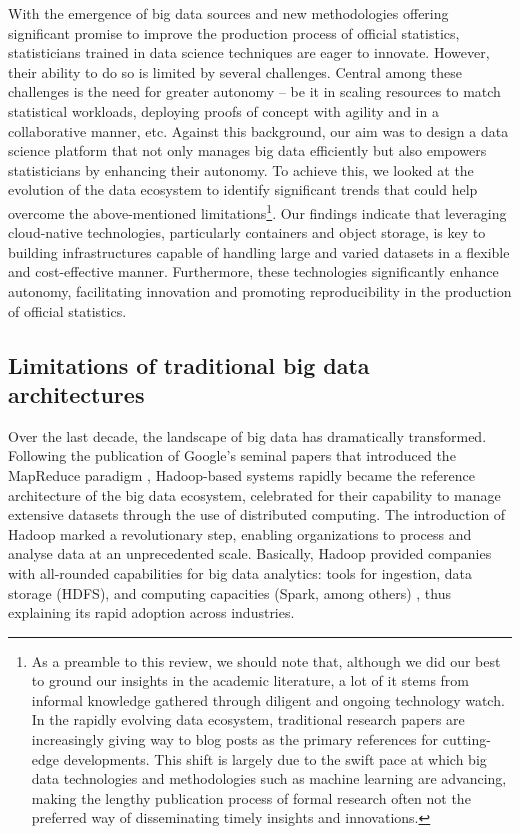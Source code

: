 \documentclass[graybox]{svmult}
\begin{document}
With the emergence of big data sources and new methodologies offering significant promise to improve the production process of official statistics, statisticians trained in data science techniques are eager to innovate. However, their ability to do so is limited by several challenges. Central among these challenges is the need for greater autonomy -- be it in scaling resources to match statistical workloads, deploying proofs of concept with agility and in a collaborative manner, etc. Against this background, our aim was to design a data science platform that not only manages big data efficiently but also empowers statisticians by enhancing their autonomy. To achieve this, we looked at the evolution of the data ecosystem to identify significant trends that could help overcome the above-mentioned limitations\footnote{As a preamble to this review, we should note that, although we did our best to ground our insights in the academic literature, a lot of it stems from informal knowledge  gathered through diligent and ongoing technology watch. In the rapidly evolving data ecosystem, traditional research papers are increasingly giving way to blog posts as the primary references for cutting-edge developments. This shift is largely due to the swift pace at which big data technologies and methodologies such as machine learning are advancing, making the lengthy publication process of formal research often not the preferred way of disseminating timely insights and innovations.}. Our findings indicate that leveraging cloud-native technologies, particularly containers and object storage, is key to building infrastructures capable of handling large and varied datasets in a flexible and cost-effective manner. Furthermore, these technologies significantly enhance autonomy, facilitating innovation and promoting reproducibility in the production of official statistics.

\subsection{Limitations of traditional big data architectures}

Over the last decade, the landscape of big data has dramatically transformed. Following the publication of Google's seminal papers that introduced the MapReduce paradigm \citep{ghemawat2003google, dean2008mapreduce}, Hadoop-based systems rapidly became the reference architecture of the big data ecosystem, celebrated for their capability to manage extensive datasets through the use of distributed computing. The introduction of Hadoop marked a revolutionary step, enabling organizations to process and analyse data at an unprecedented scale. Basically, Hadoop provided companies with all-rounded capabilities for big data analytics: tools for ingestion, data storage (HDFS), and computing capacities (Spark, among others) \citep{dhyani2014big}, thus explaining its rapid adoption across industries.
\end{document}
